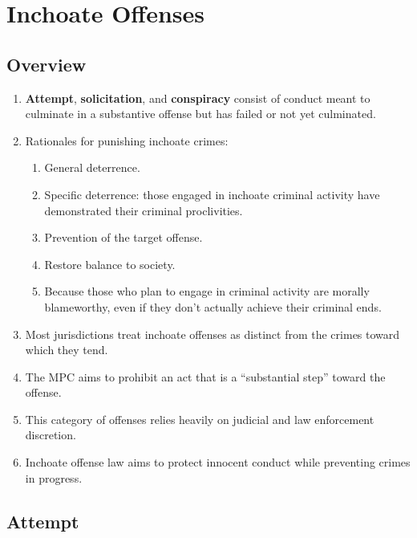 \section{Inchoate Offenses}

\subsection{Overview}

\begin{enumerate}
    \item \textbf{Attempt}, \textbf{solicitation}, and \textbf{conspiracy} 
    consist of conduct meant to culminate in a substantive offense but has 
    failed or not yet culminated.
    \item Rationales for punishing inchoate crimes:
    \begin{enumerate}
        \item General deterrence.
        \item Specific deterrence: those engaged in inchoate criminal activity 
        have demonstrated their criminal proclivities.
        \item Prevention of the target offense.
        \item Restore balance to society.
        \item Because those who plan to engage in criminal activity are 
        morally blameworthy, even if they don't actually achieve their 
        criminal ends.
    \end{enumerate}
    \item Most jurisdictions treat inchoate offenses as distinct from the 
    crimes toward which they tend.
    \item The MPC aims to prohibit an act that is a ``substantial step'' 
    toward the offense.
    \item This category of offenses relies heavily on judicial and law 
    enforcement discretion.
    \item Inchoate offense law aims to protect innocent conduct while 
    preventing crimes in progress.
\end{enumerate}

\subsection{Attempt}

